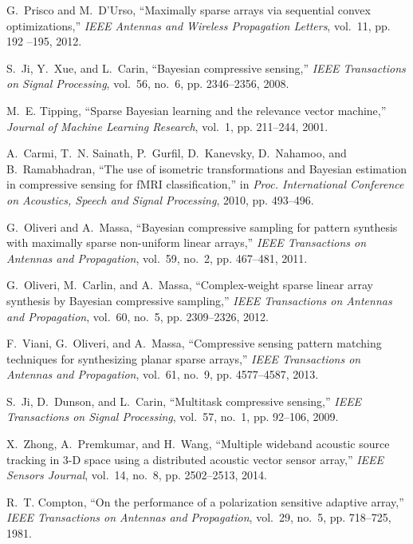 \documentclass[10pt,final]{IEEEtran}
\begin{document}
\begin{thebibliography}{40}
G.~Prisco and M.~D'Urso, ``Maximally sparse arrays via sequential convex
  optimizations,'' \emph{{IEEE} Antennas and Wireless Propagation Letters},
  vol.~11, pp. 192 --195, 2012.

S.~Ji, Y.~Xue, and L.~Carin, ``Bayesian compressive sensing,'' \emph{IEEE
  Transactions on Signal Processing}, vol.~56, no.~6, pp. 2346--2356, 2008.

M.~E. Tipping, ``Sparse {B}ayesian learning and the relevance vector machine,''
  \emph{Journal of Machine Learning Research}, vol.~1, pp. 211--244, 2001.

A.~Carmi, T.~N. Sainath, P.~Gurfil, D.~Kanevsky, D.~Nahamoo, and
  B.~Ramabhadran, ``The use of isometric transformations and {Bayesian}
  estimation in compressive sensing for {fMRI} classification,'' in \emph{Proc.
  International Conference on Acoustics, Speech and Signal Processing}, 2010,
  pp. 493--496.

G.~Oliveri and A.~Massa, ``Bayesian compressive sampling for pattern synthesis
  with maximally sparse non-uniform linear arrays,'' \emph{IEEE Transactions on
  Antennas and Propagation}, vol.~59, no.~2, pp. 467--481, 2011.

G.~Oliveri, M.~Carlin, and A.~Massa, ``Complex-weight sparse linear array
  synthesis by {Bayesian} compressive sampling,'' \emph{IEEE Transactions on
  Antennas and Propagation}, vol.~60, no.~5, pp. 2309--2326, 2012.

F.~Viani, G.~Oliveri, and A.~Massa, ``Compressive sensing pattern matching
  techniques for synthesizing planar sparse arrays,'' \emph{IEEE Transactions
  on Antennas and Propagation}, vol.~61, no.~9, pp. 4577--4587, 2013.

S.~Ji, D.~Dunson, and L.~Carin, ``Multitask compressive sensing,'' \emph{IEEE
  Transactions on Signal Processing}, vol.~57, no.~1, pp. 92--106, 2009.

X.~Zhong, A.~Premkumar, and H.~Wang, ``Multiple wideband acoustic source
  tracking in 3-{D} space using a distributed acoustic vector sensor array,''
  \emph{IEEE Sensors Journal}, vol.~14, no.~8, pp. 2502--2513, 2014.

R.~T. Compton, ``On the performance of a polarization sensitive adaptive
  array,'' \emph{IEEE Transactions on Antennas and Propagation}, vol.~29,
  no.~5, pp. 718--725, 1981.


\end{thebibliography}
\end{document}

